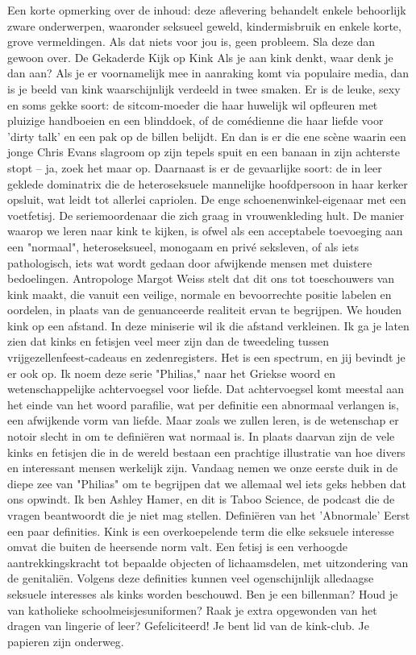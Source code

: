 Een korte opmerking over de inhoud: deze aflevering behandelt enkele behoorlijk zware onderwerpen, waaronder seksueel geweld, kindermisbruik en enkele korte, grove vermeldingen. Als dat niets voor jou is, geen probleem. Sla deze dan gewoon over.
De Gekaderde Kijk op Kink
Als je aan kink denkt, waar denk je dan aan? Als je er voornamelijk mee in aanraking komt via populaire media, dan is je beeld van kink waarschijnlijk verdeeld in twee smaken. Er is de leuke, sexy en soms gekke soort: de sitcom-moeder die haar huwelijk wil opfleuren met pluizige handboeien en een blinddoek, of de comédienne die haar liefde voor 'dirty talk' en een pak op de billen belijdt. En dan is er die ene scène waarin een jonge Chris Evans slagroom op zijn tepels spuit en een banaan in zijn achterste stopt – ja, zoek het maar op.
Daarnaast is er de gevaarlijke soort: de in leer geklede dominatrix die de heteroseksuele mannelijke hoofdpersoon in haar kerker opsluit, wat leidt tot allerlei capriolen. De enge schoenenwinkel-eigenaar met een voetfetisj. De seriemoordenaar die zich graag in vrouwenkleding hult. De manier waarop we leren naar kink te kijken, is ofwel als een acceptabele toevoeging aan een "normaal", heteroseksueel, monogaam en privé seksleven, of als iets pathologisch, iets wat wordt gedaan door afwijkende mensen met duistere bedoelingen.
Antropologe Margot Weiss stelt dat dit ons tot toeschouwers van kink maakt, die vanuit een veilige, normale en bevoorrechte positie labelen en oordelen, in plaats van de genuanceerde realiteit ervan te begrijpen. We houden kink op een afstand. In deze miniserie wil ik die afstand verkleinen. Ik ga je laten zien dat kinks en fetisjen veel meer zijn dan de tweedeling tussen vrijgezellenfeest-cadeaus en zedenregisters. Het is een spectrum, en jij bevindt je er ook op.
Ik noem deze serie "Philias," naar het Griekse woord en wetenschappelijke achtervoegsel voor liefde. Dat achtervoegsel komt meestal aan het einde van het woord parafilie, wat per definitie een abnormaal verlangen is, een afwijkende vorm van liefde. Maar zoals we zullen leren, is de wetenschap er notoir slecht in om te definiëren wat normaal is. In plaats daarvan zijn de vele kinks en fetisjen die in de wereld bestaan een prachtige illustratie van hoe divers en interessant mensen werkelijk zijn. Vandaag nemen we onze eerste duik in de diepe zee van "Philias" om te begrijpen dat we allemaal wel iets geks hebben dat ons opwindt. Ik ben Ashley Hamer, en dit is Taboo Science, de podcast die de vragen beantwoordt die je niet mag stellen.
Definiëren van het 'Abnormale'
Eerst een paar definities. Kink is een overkoepelende term die elke seksuele interesse omvat die buiten de heersende norm valt. Een fetisj is een verhoogde aantrekkingskracht tot bepaalde objecten of lichaamsdelen, met uitzondering van de genitaliën. Volgens deze definities kunnen veel ogenschijnlijk alledaagse seksuele interesses als kinks worden beschouwd. Ben je een billenman? Houd je van katholieke schoolmeisjesuniformen? Raak je extra opgewonden van het dragen van lingerie of leer? Gefeliciteerd! Je bent lid van de kink-club. Je papieren zijn onderweg.
